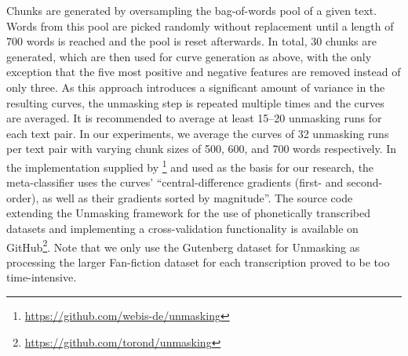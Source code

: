 Chunks are generated by oversampling the bag-of-words pool of a given text.
Words from this pool are picked randomly without replacement until a length of 700 words is reached and the pool is reset afterwards.
In total, 30 chunks are generated, which are then used for curve generation as above, with the only exception that the five most positive and negative features are removed instead of only three.
As this approach introduces a significant amount of variance in the resulting curves, the unmasking step is repeated multiple times and the curves are averaged.
It is recommended to average at least 15--20 unmasking runs for each text pair.
In our experiments, we average the curves of 32 unmasking runs per text pair with varying chunk sizes of 500, 600, and 700 words respectively.
In the implementation supplied by \cite{bevendorff2019unmaskingShortTexts}\footnote{\url{https://github.com/webis-de/unmasking}} and used as the basis for our research, the meta-classifier uses the curves' ``central-difference gradients (first- and second-order), as well as their gradients sorted by magnitude''.
The source code extending the Unmasking framework for the use of phonetically transcribed datasets and implementing a cross-validation functionality is available on GitHub\footnote{\url{https://github.com/torond/unmasking}}.
Note that we only use the Gutenberg dataset for Unmasking as processing the larger Fan-fiction dataset for each transcription proved to be too time-intensive.